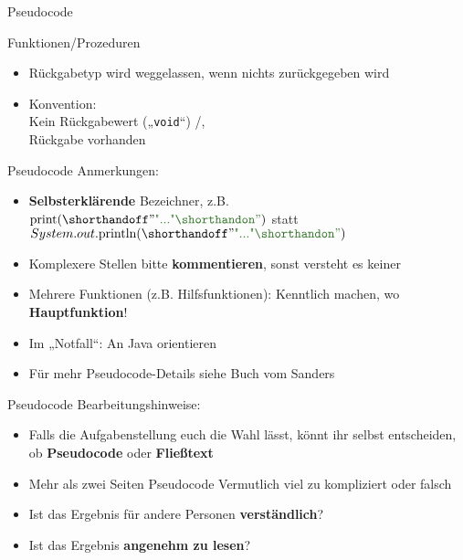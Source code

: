 \begin{frame}{Pseudocode}
	\begin{exampleblock}{Funktionen/Prozeduren}
		\begin{algorithm}[H]
		\end{algorithm}
	\end{exampleblock}
	\begin{itemize}
		\item Rückgabetyp wird weggelassen, wenn nichts zurückgegeben wird
		\item Konvention: \\ 
			\quad Kein Rückgabewert („\texttt{void}“) \impl \KwProcedure/\KwMethod, \\
			\quad Rückgabe vorhanden \impl \KwFunction
	\end{itemize}
\end{frame}


\begin{frame}{Pseudocode}
	Anmerkungen: \\
	\begin{itemize}
		\pause
		\item \textbf{Selbsterklärende} Bezeichner, z.B. $\|print|(\str{...})$ statt $System.out.\|println|(\str{...})$
		\pause
		\item Komplexere Stellen bitte \textbf{kommentieren}, sonst versteht es keiner
		\pause
		\item Mehrere Funktionen (z.B. Hilfsfunktionen): Kenntlich machen, wo \textbf{Hauptfunktion}!
		\pause
		\item Im „Notfall“: An Java orientieren
		\pause
		\item Für mehr Pseudocode-Details siehe Buch vom Sanders
	\end{itemize}
\end{frame}


\begin{frame}{Pseudocode}
	Bearbeitungshinweise: \\
	\begin{itemize}[<+->]
		\item Falls die Aufgabenstellung euch die Wahl lässt, könnt ihr selbst entscheiden, ob \textbf{Pseudocode} oder \textbf{Fließtext}
		\item Mehr als zwei Seiten Pseudocode \impl Vermutlich viel zu kompliziert oder falsch
		\item Ist das Ergebnis für andere Personen \textbf{verständlich}?
		\item Ist das Ergebnis \textbf{angenehm zu lesen}?
	\end{itemize}
\end{frame}


